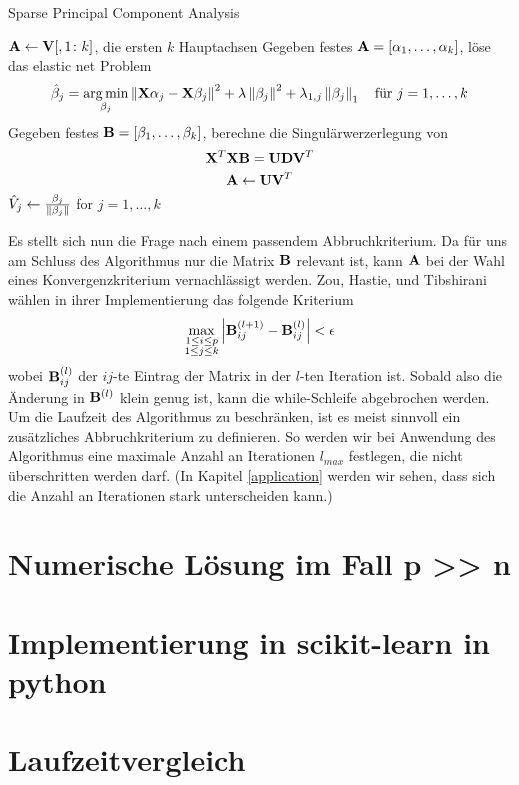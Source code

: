 \begin{algorithm}[tbh]
    \caption{Sparse Principal Component Analysis}
    \label{spca_algorithm}
    \begin{algorithmic}[1]
        	\State $\mathbf{A} \gets \mathbf{V}[,1 \colon k]$, die ersten $k$ Hauptachsen
                \State Gegeben festes $\mathbf{A} = [\alpha_1, \ldots, \alpha_k]$, löse das elastic net Problem
                $$\hat{\beta}_j = \operatorname*{arg\,min}_{\beta_j} \left\lVert \mathbf{X} \alpha_j - \mathbf{X} \beta_j \right\rVert^{2} + \lambda \left\lVert \beta_j \right\rVert^2 + \lambda_{1,j}\left\lVert \beta_j \right\rVert_{1} \quad \text{für } j = 1, \ldots, k$$
                \State Gegeben festes $\mathbf{B} = [\beta_1, \ldots, \beta_k]$, berechne die Singulärwerzerlegung von $$\mathbf{X}^T \mathbf{X} \mathbf{B} = \mathbf{U} \mathbf{D} \mathbf{V}^T$$
                $$\mathbf{A} \gets \mathbf{U} \mathbf{V}^T$$
            \EndWhile
            \State $\hat{V}_j \gets \frac{\beta_j}{\left\lVert \beta_j \right\rVert}$ for $j = 1, \ldots, k$
        \EndProcedure
    \end{algorithmic}
\end{algorithm} 

Es stellt sich nun die Frage nach einem passendem Abbruchkriterium. Da für uns am Schluss des Algorithmus nur die Matrix $\mathbf{B}$ relevant ist, kann $\mathbf{A}$ bei der Wahl eines Konvergenzkriterium vernachlässigt werden. Zou, Hastie, und Tibshirani wählen in ihrer Implementierung das folgende Kriterium
$$\max_{\substack{1 \leq i \leq p \\ 1 \leq j \leq k}} \left| \mathbf{B}_{ij}^{(l+1)} - \mathbf{B}_{ij}^{(l)} \right| < \epsilon$$
wobei $\mathbf{B}_{ij}^{(l)}$ der $ij$-te Eintrag der Matrix in der $l$-ten Iteration ist. Sobald also die Änderung in $\mathbf{B}^{(l)}$ klein genug ist, kann die while-Schleife abgebrochen werden. Um die Laufzeit des Algorithmus zu beschränken, ist es meist sinnvoll ein zusätzliches Abbruchkriterium zu definieren. So werden wir bei Anwendung des Algorithmus eine maximale Anzahl an Iterationen $l_{max}$ festlegen, die nicht überschritten werden darf. (In Kapitel \ref{application} werden wir sehen, dass sich die Anzahl an Iterationen stark unterscheiden kann.)

\section{Numerische Lösung im Fall p >> n}

\section{Implementierung in scikit-learn in python}

\section{Laufzeitvergleich}